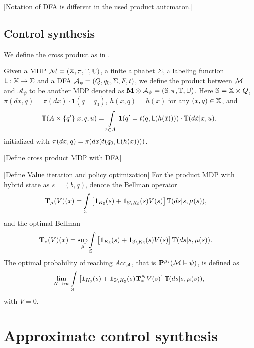 \documentclass{ifacconf}
\newcommand{\red}[1]{{\color{red} #1}}
\begin{document}
\red{[Notation of DFA is different in the used product automaton.]}
\subsection{Control synthesis}
We define the cross product as in \cite{tech_report_TACAS}.
\begin{definition}
\label{def:product}
Given a MDP $\mathcal{M}=({\mathbb{X}},\pi,\mathbb T,{\mathbb{U}})$,
a finite alphabet $\Sigma$,
a labeling function $\mathsf{L}:{\mathbb{X}}\rightarrow\Sigma$
and a DFA $\mathcal A_\psi = (Q,q_0,\Sigma,F,t)$,
we define the product between $\mathcal{M}$ and $\mathcal A_\psi$ to be another MDP denoted as
${\mathbf{M}}\otimes\mathcal A_\psi = (\mathbb S,\relax\pi,\relax{\mathbb T},{\mathbb{U}})$.
Here $\mathbb S= {\mathbb{X}}\times Q$, $\bar\pi(dx,q) = \pi(dx)\cdot \mathbf{1}(q = q_0)$, $\bar h(x,q) = h(x)$ for any $(x,q)\in\relax{{\mathbb{X}}}$, and
\begin{equation*}
  \bar{\mathbb T}(A\times\{q'\}|x,q,u) = \int_{\tilde x\in A}\mathbf{1}(q' = \tr(q,\mathsf L(h(\tilde x))))\cdot\mathbb T(d\tilde  x|x,u).
\end{equation*}
initialized with  $\relax\pi(dx,q) = \pi(dx) t(q_0,\mathsf L(h(x))))$. 
\end{definition}

\red{[Define cross product MDP with DFA]}



\red{[Define Value iteration and policy optimization]}
For the product MDP with hybrid state as $s=(b, q)$, denote the Bellman operator
\begin{align}\label{eq:V_recopt_inf}
& \Bel_\mu (V)(x) =\int_{\S}\left[\mathbf 1_{K_\S}(\bar s)+ \mathbf 1_{\S\setminus K_\S}(\bar s) V(\bar s)\right]\bar{\mathbb{T}}(d\bar s|s,\mu(s)),
\end{align}
and the optimal Bellman 
\begin{align}\label{eq:V_recopt_inf}
& \Bel_\ast (V)(x) =\sup_\mu\int_{\S}\left[\mathbf 1_{K_\S}(\bar s)+ \mathbf 1_{\S\setminus K_\S}(\bar s) V(\bar s)\right]\bar{\mathbb{T}} (d\bar s|s,\mu(s)).
\end{align}
The optimal probability of reaching $Acc_{\mathcal{A}}$, that is $\mathbf{P}^{\mu_\ast}(\mathcal{M}\vDash\psi) $, is defined as
\begin{align}
	\lim_{N\rightarrow \infty}\int_{\S}\left[\mathbf 1_{K_\S}(\bar s)+ \mathbf 1_{\S\setminus K_\S}(\bar s) \Bel^N_\ast V(\bar s)\right]\bar{\mathbb{T}} (d\bar s|s,\mu(s)),
\end{align}
with $V=0$.

\section{Approximate control synthesis}
\end{document}
